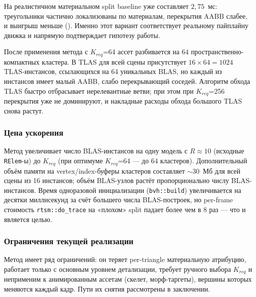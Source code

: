 На реалистичном материальном split baseline уже составляет $2{,}75$~мс:
треугольники частично локализованы по материалам, перекрытия AABB
слабее, и выигрыш меньше (). Именно этот вариант
соответствует реальному пайплайну движка и напрямую подтверждает
гипотезу работы.

После применения метода с $K_{req}$=64 ассет разбивается
на $64$ пространственно-компактных кластера. В TLAS для всей сцены
присутствует $16 \times 64 = 1024$ TLAS-инстансов, ссылающихся на 64 уникальных BLAS, но каждый из инстансов имеет малый AABB,
слабо перекрывающий соседей. Алгоритм обхода TLAS быстро отбрасывает
нерелевантные ветви; при этом при $K_{req}$=256 перекрытия уже
не доминируют, и накладные расходы обхода большого TLAS снова растут.

\subsubsection{Цена ускорения}

Метод увеличивает число BLAS-инстансов на одну модель с
$R \approx 10$ (исходные \texttt{RElem}-ы) до
$K_{req}$ (при оптимуме $K_{req}$=64 --- до
$64$ кластеров). Дополнительный объём памяти на vertex/index-буферы
кластеров составляет $\sim 30$~Мб для всей сцены из 16
инстансов; объём BLAS-узлов растёт пропорционально числу
BLAS-инстансов. Время одноразовой инициализации
(\texttt{bvh::build}) увеличивается на десятки миллисекунд за
счёт большего числа BLAS-построек, но per-frame стоимость
\texttt{rtsm::do\_trace} на «плохом» split падает более чем
в $8$ раз --- что и является целью.

\subsubsection{Ограничения текущей реализации}

Метод имеет ряд ограничений: он теряет per-triangle материальную
атрибуцию, работает только с основным уровнем
детализации, требует ручного выбора $K_{req}$ и неприменим к
анимированным ассетам (скелет, морф-таргеты), вершины которых меняются
каждый кадр. Пути их снятия рассмотрены в заключении.
